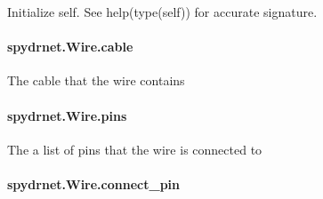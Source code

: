 \documentclass[letterpaper,10pt,english,openany,oneside]{sphinxmanual}
\begin{document}
\begin{fulllineitems}
\label{\detokenize{reference/classes/generated/spydrnet.Wire.__init__:spydrnet.Wire.__init__}}
Initialize self.  See help(type(self)) for accurate signature.

\end{fulllineitems}



\paragraph{spydrnet.Wire.cable}
\label{\detokenize{reference/classes/generated/spydrnet.Wire.cable:spydrnet-wire-cable}}\label{\detokenize{reference/classes/generated/spydrnet.Wire.cable::doc}}

\begin{fulllineitems}
\label{\detokenize{reference/classes/generated/spydrnet.Wire.cable:spydrnet.Wire.cable}}
The cable that the wire contains

\end{fulllineitems}



\paragraph{spydrnet.Wire.pins}
\label{\detokenize{reference/classes/generated/spydrnet.Wire.pins:spydrnet-wire-pins}}\label{\detokenize{reference/classes/generated/spydrnet.Wire.pins::doc}}

\begin{fulllineitems}
\label{\detokenize{reference/classes/generated/spydrnet.Wire.pins:spydrnet.Wire.pins}}
The a list of pins that the wire is connected to

\end{fulllineitems}



\paragraph{spydrnet.Wire.connect\_pin}
\label{\detokenize{reference/classes/generated/spydrnet.Wire.connect_pin:spydrnet-wire-connect-pin}}\label{\detokenize{reference/classes/generated/spydrnet.Wire.connect_pin::doc}}
\end{document}

